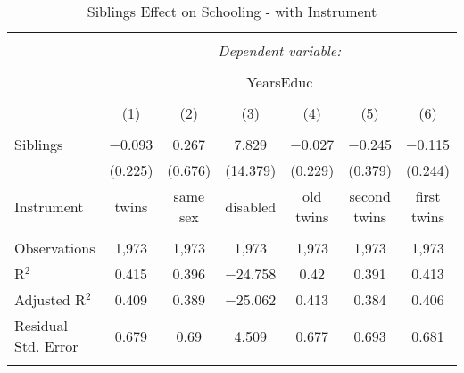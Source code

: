 
\begin{table}[!htbp] \centering 
  \caption{Siblings Effect on Schooling - with Instrument} 
  \label{} 
\begin{tabular}{@{\extracolsep{5pt}}lcccccc} 
\\[-1.8ex]\hline 
\hline \\[-1.8ex] 
 & \multicolumn{6}{c}{\textit{Dependent variable:}} \\ 
\cline{2-7} 
\\[-1.8ex] & \multicolumn{6}{c}{YearsEduc} \\ 
\\[-1.8ex] & (1) & (2) & (3) & (4) & (5) & (6)\\ 
\hline \\[-1.8ex] 
 Siblings & $-$0.093 & 0.267 & 7.829 & $-$0.027 & $-$0.245 & $-$0.115 \\ 
  & (0.225) & (0.676) & (14.379) & (0.229) & (0.379) & (0.244) \\
 Instrument & twins & same sex & disabled & old twins & second twins & first twins \\
 \hline \\[-1.8ex] 
Observations & 1,973 & 1,973 & 1,973 & 1,973 & 1,973 & 1,973 \\ 
R$^{2}$ & 0.415 & 0.396 & $-$24.758 & 0.42 & 0.391 & 0.413 \\ 
Adjusted R$^{2}$ & 0.409 & 0.389 & $-$25.062 & 0.413 & 0.384 & 0.406 \\ 
Residual Std. Error & 0.679 & 0.69 & 4.509 & 0.677 & 0.693 & 0.681 \\ 
\hline 
\hline \\[-1.8ex] 
\end{tabular} 
\end{table} 
